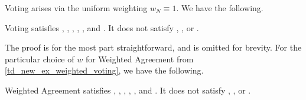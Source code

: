 Voting arises via the uniform weighting $w_N \equiv 1$. We have the following.

\begin{theorem}
    Voting satisfies \claimcoherence{}, \symmetry{}, \freshposresp{},
    \marginaltrustworthiness{}, \trustbasedmon{}, \classicalindependence{} and
    \disjointindependence{}. It does not satisfy \sourcecoherence{},
    \sourceposresp{}, \conflictcoherence{} or \anticoherence{}.
\end{theorem}

The proof is for the most part straightforward, and is omitted for brevity. For
the particular choice of $w$ for Weighted Agreement from
\cref{td_new_ex_weighted_voting}, we have the following.

\begin{theorem}
    Weighted Agreement satisfies \claimcoherence{}, \symmetry{},
    \freshposresp{}, \sourceposresp{}, \marginaltrustworthiness{},
    \trustbasedmon{} and \disjointindependence{}. It does not satisfy
    \sourcecoherence{}, \classicalindependence{}, \conflictcoherence{} or
    \anticoherence{}.
\end{theorem}

